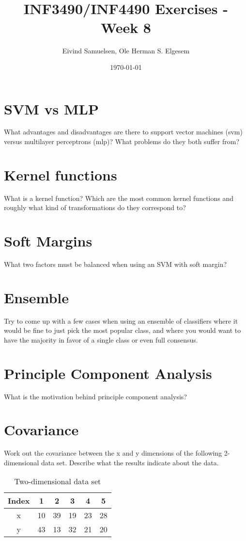 \documentclass{article}           %
\title{\vspace{-2cm}INF3490/INF4490 Exercises - Week 8}
\author{Eivind Samuelsen, Ole Herman S. Elgesem}
\date{\today}
\newcommand\marginsymbol[1][0pt]{%
  \tabto*{0cm}\makebox[\dimexpr-1cm-#1\relax][r]{$\mathbb{P}$}\tabto*{\TabPrevPos}}
\begin{document}
    \renewcommand\marginsymbol[1][0pt]{%
  \tabto*{0cm}\makebox[-1cm][c]{$\mathbb{P}$}\tabto*{\TabPrevPos}}

\maketitle


\section{SVM vs MLP}
What advantages and disadvantages are there to support vector machines (svm) versus multilayer perceptrons (mlp)?
What problems do they both suffer from?

\section{Kernel functions}
What is a kernel function?
Which are the most common kernel functions and roughly what kind of transformations do they correspond to?

\section{Soft Margins}
What two factors must be balanced when using an SVM with soft margin?

\section{Ensemble}
Try to come up with a few cases when using an ensemble of classifiers where it would be fine to just pick the most popular class, and where you would want to have the majority in favor of a single class or even full consensus.

\section{Principle Component Analysis}
What is the motivation behind principle component analysis?

\section{Covariance}
Work out the covariance between the x and y dimensions of the following 2-dimensional data set.
Describe what the results indicate about the data.

\begin{table}[H]
\centering
  \begin{tabular}{c|c|c|c|c|c}
    Index &  1 &  2 &  3 &  4 &  5 \\ \hline
    x     & 10 & 39 & 19 & 23 & 28 \\
    y     & 43 & 13 & 32 & 21 & 20 \\ \hline
  \end{tabular}
  \caption{Two-dimensional data set}
  \label{tab:cov}
\end{table}


\end{document}
